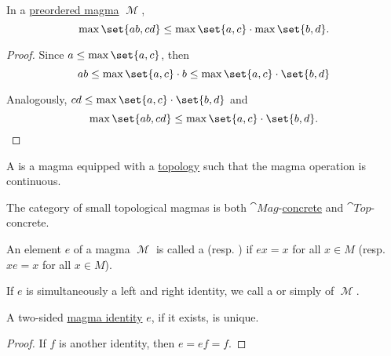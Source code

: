 \begin{proposition}\label{thm:preordered_magma_max_distributivity}
  In a \hyperref[def:preordered_magma]{preordered magma} \( \mscrM \),
  \begin{equation}\label{eq:thm:preordered_magma_max_distributivity}
    \max \set{a b, c d} \leq \max \set{a, c} \cdot \max \set{b, d}.
  \end{equation}
\end{proposition}
\begin{proof}
  Since \( a \leq \max \set{a, c} \), then
  \begin{equation*}
    ab
    \leq
    \max \set{a, c} \cdot b
    \leq
    \max \set{a, c} \cdot \set{b, d}
  \end{equation*}

  Analogously, \( cd \leq \max \set{a, c} \cdot \set{b, d} \) and
  \begin{equation*}
    \max \set{a b, c d} \leq \max \set{a, c} \cdot \set{b, d}.
  \end{equation*}
\end{proof}

\begin{definition}\label{def:topological_magma}
  A  is a magma equipped with a \hyperref[def:topological_space]{topology} such that the magma operation is continuous.

  The category of small topological magmas is both \hyperref[def:magma/category]{\( \cat{Mag} \)}-\hyperref[def:concrete_category]{concrete} and \hyperref[def:category_of_small_topological_spaces]{\( \cat{Top} \)}-concrete.
\end{definition}

\begin{definition}\label{def:magma_identity}
  An element \( e \) of a magma \( \mscrM \) is called a  (resp. ) if \( ex = x \) for all \( x \in M \) (resp. \( xe = x \) for all \( x \in M \)).

  If \( e \) is simultaneously a left and right identity, we call a  or simply  of \( \mscrM \).
\end{definition}

\begin{proposition}\label{thm:magma_identity_unique}
  A two-sided \hyperref[def:magma_identity]{magma identity} \( e \), if it exists, is unique.
\end{proposition}
\begin{proof}
  If \( f \) is another identity, then \( e = ef = f \).
\end{proof}

